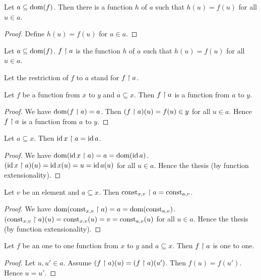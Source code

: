 \documentclass[../../sets-and-functions.ftl.tex]{subfiles}
\begin{document}
  \begin{forthel}
    \begin{lemma}
      Let $a \subseteq \operatorname{dom}(f)$.
      Then there is a function $h$ of $a$ such that $h(u) = f(u)$ for all $u \in a$.
    \end{lemma}
    \begin{proof}
      Define $h(u) = f(u)$ for $u \in a$.
    \end{proof}

    \begin{definition}
      Let $a \subseteq \operatorname{dom}(f)$.
      $f \upharpoonright a$ is the function $h$ of $a$ such that $h(u) = f(u)$ for all $u \in a$.
    \end{definition}

    Let the restriction of $f$ to $a$ stand for $f \upharpoonright a$.

    \begin{proposition}[SF 02 01 589280]
      Let $f$ be a function from $x$ to $y$ and $a \subseteq x$.
      Then $f \upharpoonright a$ is a function from $a$ to $y$.
    \end{proposition}
    \begin{proof}
      We have $\operatorname{dom}(f \upharpoonright a) = a$.
      Then $(f \upharpoonright a)(u) = f(u) \in y$ for all $u \in a$.
      Hence $f \upharpoonright a$ is a function from $a$ to $y$.
    \end{proof}

    \begin{proposition}[SF 02 01 795968]
      Let $a \subseteq x$.
      Then $\operatorname{id}{x} \upharpoonright a = \operatorname{id}{a}$.
    \end{proposition}
    \begin{proof}
      We have $\operatorname{dom}(\operatorname{id}{x} \upharpoonright a) = a = \operatorname{dom}(\operatorname{id}{a})$.
      $(\operatorname{id}{x} \upharpoonright a)(u) = \operatorname{id}{x}(u) = u = \operatorname{id}{a}(u)$ for all $u \in a$.
      Hence the thesis (by function extensionality).
    \end{proof}

    \begin{proposition}[SF 02 01 575265]
      Let $v$ be an element and $a \subseteq x$.
      Then $\mbox{const}_{x,v} \upharpoonright a = \mbox{const}_{a,v}$.
    \end{proposition}
    \begin{proof}
      We have $\operatorname{dom}(\mbox{const}_{x,v} \upharpoonright a) = a = \operatorname{dom}(\mbox{const}_{a,v})$.
      $(\mbox{const}_{x,v} \upharpoonright a)(u) = \mbox{const}_{x,v}(u) = v = \mbox{const}_{a,v}(u)$ for all $u \in a$.
      Hence the thesis (by function extensionality).
    \end{proof}

    \begin{proposition}[SF 02 01 507691]
      Let $f$ be an one to one function from $x$ to $y$ and $a \subseteq x$.
      Then $f \upharpoonright a$ is one to one.
    \end{proposition}
    \begin{proof}
      Let $u,u' \in a$.
      Assume $(f \upharpoonright a)(u) = (f \upharpoonright a)(u')$.
      Then $f(u) = f(u')$.
      Hence $u = u'$.
    \end{proof}
  \end{forthel}
\end{document}
